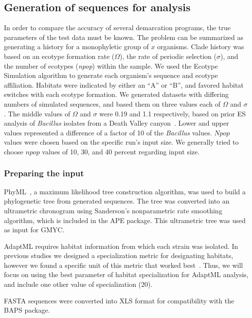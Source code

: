 \subsection*{Generation of sequences for analysis}
In order to compare the accuracy of several demarcation programs, the true parameters of the test data must be known.
The problem can be summarized as generating a history for a monophyletic group of $x$ organisms.
Clade history was based on an ecotype formation rate ($\Omega$), the rate of periodic selection ($\sigma$), and the number of ecotypes (\emph{npop}) within the sample.
We used the Ecotype Simulation algorithm to generate each organism's sequence and ecotype affiliation.
Habitats were indicated by either an ``A'' or ``B'', and favored habitat switches with each ecotype formation.
We generated datasets with differing numbers of simulated sequences, and based them on three values each of $\Omega$ and $\sigma$.
The middle values of $\Omega$ and $\sigma$ were 0.19 and 1.1 respectively, based on prior ES analysis of \emph{Bacillus} isolates from a Death Valley canyon~\cite{connor2010ecology}.
Lower and upper values represented a difference of a factor of 10 of the \emph{Bacillus} values.
$Npop$ values were chosen based on the specific run's input size.
We generally tried to choose $npop$ values of 10, 30, and 40 percent regarding input size.

\subsubsection*{Preparing the input}
PhyML~\cite{guindon2010new}, a maximum likelihood tree construction algorithm, was used to build a phylogenetic tree from generated sequences.
The tree was converted into an ultrametric chronogram using Sanderson's nonparametric rate smoothing algorithm, which is included in the APE package.
This ultrametric tree was used as input for GMYC.

AdaptML requires habitat information from which each strain was isolated.
In previous studies we designed a specialization metric for designating habitats, however we found a specific unit of this metric that worked best~\cite{carlo}.
Thus, we will focus on using the best parameter of habitat specialization for AdaptML analysis, and include one other value of specialization (20).

FASTA sequences were converted into XLS format for compatibility with the BAPS package.

